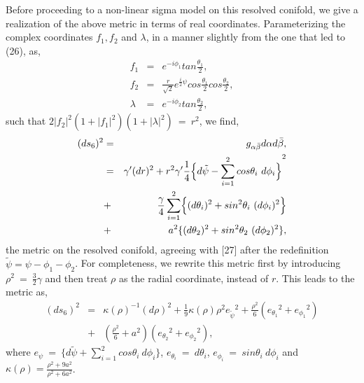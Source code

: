 \documentclass[a4paper,12pt]{article}
\begin{document}
Before proceeding to a non-linear sigma model on this resolved conifold, we 
give a realization of the above metric in terms of real coordinates.  
Parameterizing the complex coordinates $f_1,f_2$ and $\lambda$, in a 
manner slightly from the one that led to (26), as,
\begin{eqnarray}
f_1 &=& e^{-i{\phi}_1} tan{\frac{{\theta}_1}{2}}, \nonumber \\
f_2 &=& \frac{r}{\sqrt{2}} e^{\frac{i}{2}\psi} cos{\frac{{\theta}_1}{2}}
cos{\frac{{\theta}_2}{2}}, \nonumber \\
\lambda &=& e^{-i{\phi}_2} tan {\frac{{\theta}_2}{2}},
\end{eqnarray}
such that $2|f_2|^2(1+|f_1|^2)(1+| \lambda |^2)\ =\ r^2$,  
we find, 
\begin{eqnarray}
(ds_6)^2 &=& g_{\alpha \bar{\beta}} d\alpha d\bar{\beta}, \nonumber \\
 &=& {\gamma}'(dr)^2+r^2{\gamma}'\frac{1}{4} {\Bigl\{ d\tilde{\psi} 
- \sum_{i=1}
^{2} cos{\theta}_i\ d{\phi}_i \Bigr\} }^2 \nonumber \\
&+& \frac{\gamma}{4} \sum_{i=1}^{2} \Bigl\{ (d{\theta}_i)^2 + sin^2
{\theta}_i \ (d{\phi}_i)^2\Bigr\} \nonumber \\
&+& a^2 \{ (d{\theta}_2)^2 + sin^2{\theta}_2\ (d{\phi}_2)^2\},
\end{eqnarray} 
the metric on the resolved conifold, agreeing with [27] after the 
redefinition $\tilde{\psi}=\psi -{\phi}_1-{\phi}_2$. 
For completeness, we rewrite this 
metric first by introducing ${\rho}^2 \ =\ \frac{3}{2}\gamma $ and then 
treat $\rho$ as the radial coordinate, instead of $r$. This leads to the 
metric as,
\begin{eqnarray}
(ds_6)^2&=& {\kappa (\rho)}^{-1} (d\rho )^2 + \frac{1}{9} \kappa (\rho)
{\rho}^2 {e_{\tilde{\psi}}}^2 + \frac{{\rho}^2}{6}( {e_{{\theta}_1}}^2+
{e_{{\phi}_1}}^2) \nonumber \\
&+& (\frac{{\rho}^2}{6}+a^2)({e_{{\theta}_2}}^2+{e_{{\phi}_2}}^2),
\end{eqnarray}
where $e_{\psi}\ =\ \{ d\tilde{\psi} + \sum_{i=1}^{2}
cos{\theta}_i\ d{\phi}_i\}$, $e_{{\theta}_i}\ =\ d{\theta}_i$,  
$e_{{\phi}_i}\ =\ sin {\theta}_i\ d{\phi}_i$ and $\kappa (\rho)=
\frac{{\rho}^2+9a^2}{{\rho}^2+6a^2}$.    

\vspace{0.5cm}
\end{document}
